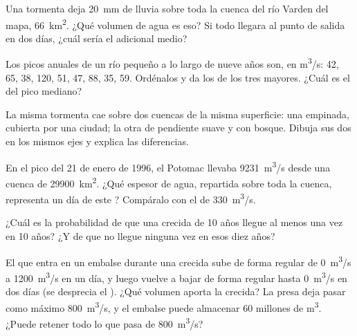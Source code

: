 \begin{exercise}[$\star\star$]\label{exo:g10:drainage-basins:7}
Una tormenta deja \qty{20}{mm} de lluvia sobre toda la cuenca del río Varden
del mapa, \qty{66}{km^2}. ¿Qué volumen de agua es eso? Si todo llegara al
punto de salida en dos días, ¿cuál sería el  adicional medio?
\end{exercise}

\begin{exercise}[$\star\star$]\label{exo:g10:drainage-basins:8}
Los picos anuales de un río pequeño a lo largo de nueve años son, en
\unit{m^3/s}: \num{42}, \num{65}, \num{38}, \num{120}, \num{51}, \num{47},
\num{88}, \num{35}, \num{59}. Ordénalos y da los  de los
tres mayores. ¿Cuál es el  del pico mediano?
\end{exercise}

\begin{exercise}[$\star\star$]\label{exo:g10:drainage-basins:9}
La misma tormenta cae sobre dos cuencas de la misma superficie: una
empinada, cubierta por una ciudad; la otra de pendiente suave y con bosque.
Dibuja sus dos  en los mismos ejes y explica las diferencias.
\end{exercise}

\begin{exercise}[$\star\star$]\label{exo:g10:drainage-basins:10}
En el pico del 21 de enero de 1996, el Potomac llevaba \qty{9231}{m^3/s}
desde una cuenca de \qty{29900}{km^2}. ¿Qué espesor de agua, repartida sobre
toda la cuenca, representa un día de este ? Compáralo con el  de \qty{330}{m^3/s}.
\end{exercise}

\begin{exercise}[$\star\star$]\label{exo:g10:drainage-basins:11}
¿Cuál es la probabilidad de que una crecida de \num{10} años llegue al menos
una vez en \num{10} años? ¿Y de que no llegue ninguna vez en esos diez años?
\end{exercise}

\begin{exercise}[$\star\star\star$]\label{exo:g10:drainage-basins:12}
El  que entra en un embalse durante una crecida sube de forma regular
de \qty{0}{m^3/s} a \qty{1200}{m^3/s} en un día, y luego vuelve a bajar de
forma regular hasta \qty{0}{m^3/s} en dos días (se desprecia el ). ¿Qué volumen aporta la crecida? La presa deja pasar como máximo
\qty{800}{m^3/s}, y el embalse puede almacenar \num{60} millones de
\unit{m^3}. ¿Puede retener todo lo que pasa de \qty{800}{m^3/s}?
\end{exercise}

